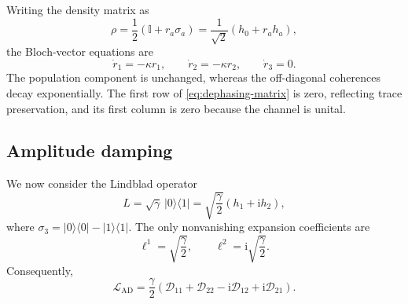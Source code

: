 \documentclass[notitlepage,aip,reprint,onecolumn]{revtex4-1}
\theoremstyle{definition}
\begin{document}
Writing the density matrix as
\begin{equation}\label{eq:qubit-Bloch-expansion}
    \rho
    =
    \frac12
    \left(
    \mathbb I+r_a\sigma_a
    \right)
    =
    \frac1{\sqrt2}
    \left(
    h_0+r_ah_a
    \right),
\end{equation}
the Bloch-vector equations are
\begin{equation}\label{eq:dephasing-Bloch-equations}
    \dot r_1
    =
    -\kappa r_1,
    \qquad
    \dot r_2
    =
    -\kappa r_2,
    \qquad
    \dot r_3
    =
    0.
\end{equation}
The population component is unchanged, whereas the off-diagonal coherences decay exponentially. The first row of \eqref{eq:dephasing-matrix} is zero, reflecting trace preservation, and its first column is zero because the channel is unital.

\subsection{Amplitude damping}

We now consider the Lindblad operator
\begin{equation}\label{eq:amplitude-damping-L}
    L
    =
    \sqrt{\gamma}\,
    \lvert0\rangle\langle1\rvert
    =
    \sqrt{\frac{\gamma}{2}}
    \left(
    h_1+\mathrm{i} h_2
    \right),
\end{equation}
where \( \sigma_3 = \lvert0\rangle\langle0\rvert - \lvert1\rangle\langle1\rvert \). The only nonvanishing expansion coefficients are
\[
    \ell^1
    =
    \sqrt{\frac{\gamma}{2}},
    \qquad
    \ell^2
    =
    \mathrm{i}\sqrt{\frac{\gamma}{2}}.
\]
Consequently,
\begin{equation}\label{eq:amplitude-damping-D-decomposition}
    \mathcal L_{\mathrm{AD}}
    =
    \frac{\gamma}{2}
    \left(
    \mathcal D_{11}
    +
    \mathcal D_{22}
    -
    \mathrm{i}\mathcal D_{12}
    +
    \mathrm{i}\mathcal D_{21}
    \right).
\end{equation}
\end{document}
